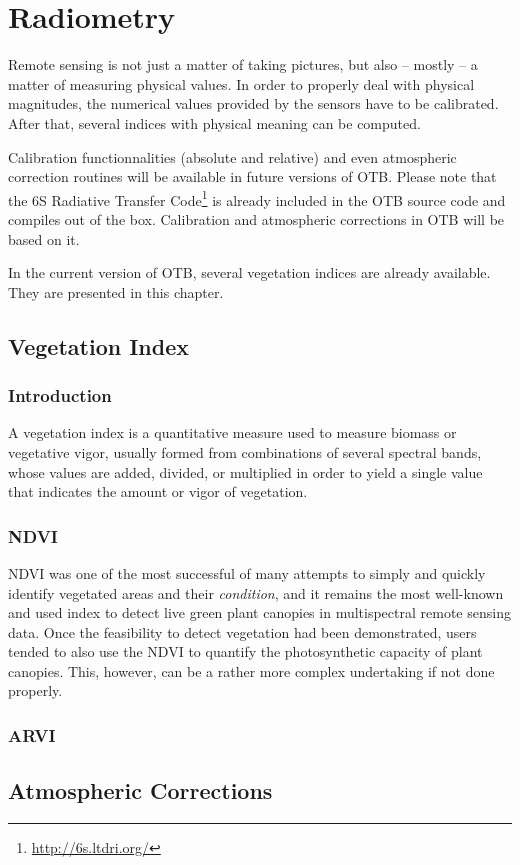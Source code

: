 \chapter{Radiometry}

Remote sensing is not just a matter of taking pictures, but also --
mostly -- a matter of measuring physical values. In order to properly
deal with physical magnitudes, the numerical values provided by the
sensors have to be calibrated. After that, several indices with
physical meaning can be computed.

Calibration functionnalities (absolute and relative) and even
atmospheric correction routines will be available in future versions
of OTB. Please note that the 6S Radiative Transfer Code\footnote{\url{http://6s.ltdri.org/}} is already included in the OTB source code and
compiles out of the box. Calibration and atmospheric corrections in
OTB will be based on it.

In the current version of OTB, several vegetation indices are already
available. They are presented in this chapter.


\section{Vegetation Index}
\label{sec:VegetationIndex}

\subsection{Introduction}
A vegetation index is a quantitative measure used to measure biomass
or vegetative vigor, usually formed from combinations of several
spectral bands, whose values are added, divided, or multiplied in
order to yield a single value that indicates the amount or vigor of
vegetation.

\subsection{NDVI}
\label{secNDVI}
NDVI was one of the most successful of many attempts to simply and
quickly identify vegetated areas and their {\em condition}, and it remains
the most well-known and used index to detect live green plant canopies
in multispectral remote sensing data. Once the feasibility to detect
vegetation had been demonstrated, users tended to also use the NDVI to
quantify the photosynthetic capacity of plant canopies. This, however,
can be a rather more complex undertaking if not done properly.


\subsection{ARVI}
\label{secARVI}




\section{Atmospheric Corrections}
\label{secAtmosphericCorrections}

